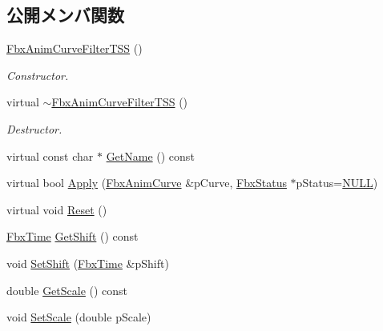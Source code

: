 \subsection*{公開メンバ関数}
\begin{DoxyCompactItemize}
\item 
\hyperlink{class_fbx_anim_curve_filter_t_s_s_a31c1875bfeb94aec880e46c449853409}{Fbx\+Anim\+Curve\+Filter\+T\+SS} ()
\begin{DoxyCompactList}\small\item\em Constructor. \end{DoxyCompactList}\item 
virtual \hyperlink{class_fbx_anim_curve_filter_t_s_s_a6bf44d1312b857b4a866ba0b09f4a027}{$\sim$\+Fbx\+Anim\+Curve\+Filter\+T\+SS} ()
\begin{DoxyCompactList}\small\item\em Destructor. \end{DoxyCompactList}\item 
virtual const char $\ast$ \hyperlink{class_fbx_anim_curve_filter_t_s_s_acf96262688c855b1c9b5ead93247e758}{Get\+Name} () const
\item 
virtual bool \hyperlink{class_fbx_anim_curve_filter_t_s_s_a5ae3b50e72c3eb6846938a01b3559b21}{Apply} (\hyperlink{class_fbx_anim_curve}{Fbx\+Anim\+Curve} \&p\+Curve, \hyperlink{class_fbx_status}{Fbx\+Status} $\ast$p\+Status=\hyperlink{fbxarch_8h_a070d2ce7b6bb7e5c05602aa8c308d0c4}{N\+U\+LL})
\item 
virtual void \hyperlink{class_fbx_anim_curve_filter_t_s_s_aebf5798bd833f7dced2a11aea61b1c35}{Reset} ()
\item 
\hyperlink{class_fbx_time}{Fbx\+Time} \hyperlink{class_fbx_anim_curve_filter_t_s_s_aee0e42f4c5e802418408d0c0640f9b98}{Get\+Shift} () const
\item 
void \hyperlink{class_fbx_anim_curve_filter_t_s_s_a7f8c6250190a961284e894e977b4233f}{Set\+Shift} (\hyperlink{class_fbx_time}{Fbx\+Time} \&p\+Shift)
\item 
double \hyperlink{class_fbx_anim_curve_filter_t_s_s_a0b5ee5c02fdbc4cd8cfadaa5f761280d}{Get\+Scale} () const
\item 
void \hyperlink{class_fbx_anim_curve_filter_t_s_s_a0f3661baf7b2511fb6d9a292d19a31dc}{Set\+Scale} (double p\+Scale)
\end{DoxyCompactItemize}

